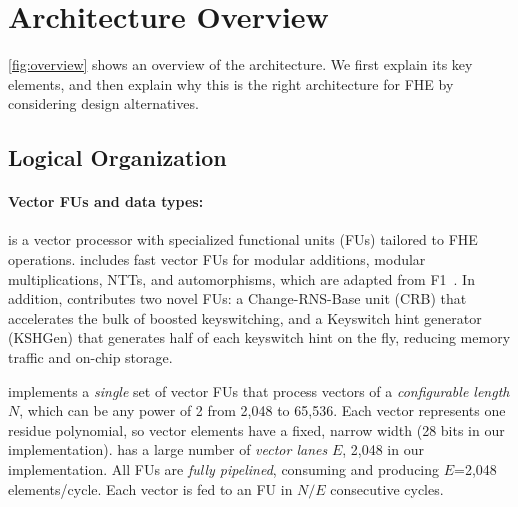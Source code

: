\section{Architecture Overview}\label{sec:overview}

\autoref{fig:overview} shows an overview of the \name architecture.
We first explain its key elements, and then explain why this is the right
architecture for FHE by considering design alternatives.


\subsection{Logical Organization}

\paragraph{Vector FUs and data types:}
\name is a vector processor with specialized functional units (FUs) tailored to FHE operations.
\name includes fast vector FUs for modular additions, modular multiplications, NTTs, and automorphisms,
which are adapted from F1~\cite{feldmann:micro21:f1}.
In addition, \name contributes two novel FUs:
a Change-RNS-Base unit (CRB) that accelerates the bulk of boosted keyswitching,
and a Keyswitch hint generator (KSHGen) that generates half of each keyswitch
hint on the fly, reducing memory traffic and on-chip storage.

\figOverview

\name implements a \emph{single} set of vector FUs
that process vectors of a \emph{configurable length} $N$,
which can be any power of 2 from 2,048 to 65,536.
Each vector represents one residue polynomial, so vector elements
have a fixed, narrow width (28 bits in our implementation).
\name has a large number of \emph{vector lanes} $E$, 2,048 in our implementation.
All FUs are \emph{fully pipelined}, consuming and producing $E$=2,048 elements/cycle.
Each vector is fed to an FU in $N/E$ consecutive cycles.

